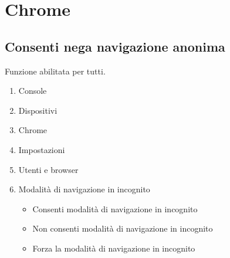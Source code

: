 \chapter{Chrome}
\section{Consenti nega navigazione anonima}
Funzione abilitata per tutti.
\begin{enumerate}
	\item Console
	\item Dispositivi
	\item Chrome
	\item Impostazioni
	\item Utenti e browser
	\item Modalità di navigazione in incognito
	\begin{itemize}
		\item Consenti modalità di navigazione in incognito
		\item Non consenti modalità di navigazione in incognito
		\item Forza la modalità di navigazione in incognito
	\end{itemize}
\end{enumerate}
 